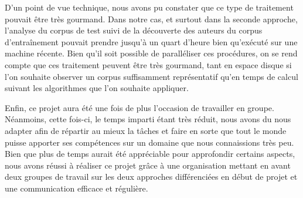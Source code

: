 \documentclass[a4paper,12pt]{report}
\begin{document}
D'un point de vue technique, nous avons pu constater que ce type de traitement pouvait être très gourmand. Dans notre cas, et surtout dans la seconde approche, l'analyse du corpus de test suivi de la découverte des auteurs du corpus d'entraînement pouvait prendre jusqu'à un quart d'heure bien qu'exécuté sur une machine récente. Bien qu'il soit possible de paralléliser ces procédures, on se rend compte que ces traitement peuvent être très gourmand, tant en espace disque si l'on souhaite observer un corpus suffisamment représentatif qu'en temps de calcul suivant les algorithmes que l'on souhaite appliquer.

Enfin, ce projet aura été une fois de plus l'occasion de travailler en groupe. Néanmoins, cette fois-ci, le temps imparti étant très réduit, nous avons du nous adapter afin de répartir au mieux la tâches et faire en sorte que tout le monde puisse apporter ses compétences sur un domaine que nous connaissions très peu. Bien que plus de temps aurait été appréciable pour approfondir certains aspects, nous avons réussi à réaliser ce projet grâce à une organisation mettant en avant deux groupes de travail sur les deux approches différenciées en début de projet et une communication efficace et régulière.
\end{document}
